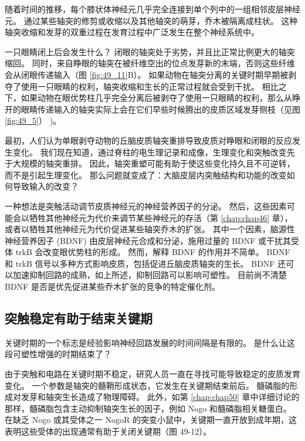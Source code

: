 随着时间的推移，每个膝状体神经元几乎完全连接到单个列中的一组相邻皮层神经元。 通过某些轴突的修剪或收缩以及其他轴突的萌芽，乔木被隔离成柱状。 这种轴突收缩和发芽的双重过程在发育过程中广泛发生在整个神经系统中。

一只眼睛闭上后会发生什么？ 闭眼的轴突处于劣势，并且比正常比例更大的轴突缩回。 同时，来自睁眼的轴突在被纤维空出的位点发芽新的末端，否则这些纤维会从闭眼传递输入（图 \ref{fig:49_11}B）。 如果动物在轴突分离的关键时期早期被剥夺了使用一只眼睛的权利，轴突收缩和生长的正常过程就会受到干扰。 相比之下，如果动物在眼优势柱几乎完全分离后被剥夺了使用一只眼睛的权利，那么从睁开的眼睛传递输入的轴突实际上会在它们早些时候腾出的皮质区域发芽侧枝（见图 \ref{fig:49_5}） )。

最初，人们认为单眼剥夺动物的丘脑皮质轴突重排导致皮质对睁眼和闭眼的反应发生变化。 我们现在知道，通过脊柱的电生理记录和成像，生理变化和突触改变先于大规模的轴突重排。 因此，轴突重塑可能有助于使这些变化持久且不可逆转，而不是引起生理变化。 那么问题就变成了：大脑皮层内突触结构和功能的改变如何导致输入的改变？

一种想法是突触活动调节皮质神经元的神经营养因子的分泌。 然后，这些因素可能会以牺牲其他神经元为代价来调节某些神经元的存活（第 \ref{chap:chap46} 章），或者以牺牲其他神经元为代价促进某些轴突乔木的扩张。 其中一个因素，脑源性神经营养因子 (BDNF) 由皮层神经元合成和分泌，施用过量的 BDNF 或干扰其受体 trkB 会改变眼优势柱的形成。 然而，解释 BDNF 的作用并不简单。 BDNF 和 trkB 信号以多种方式影响皮质，包括促进丘脑皮质轴突的生长。 BDNF 还可以加速抑制回路的成熟，如上所述，抑制回路可以影响可塑性。 目前尚不清楚 BDNF 是否是优先促进某些乔木扩张的竞争的特定催化剂。

\subsection{突触稳定有助于结束关键期}

关键时期的一个标志是经验影响神经回路发展的时间间隔是有限的。 是什么让这段可塑性增强的时期结束了？

由于突触和电路在关键时期不稳定，研究人员一直在寻找可能导致稳定的皮质发育变化。 一个参数是轴突的髓鞘形成状态，它发生在关键期结束前后。 髓磷脂的形成对发芽和轴突生长造成了物理障碍。 此外，如第 \ref{chap:chap50} 章中详细讨论的那样，髓磷脂包含主动抑制轴突生长的因子，例如 Nogo 和髓磷脂相关糖蛋白。 
在缺乏 Nogo 或其受体之一 NogoR 的突变小鼠中，关键期一直开放到成年期，这表明这些受体的出现通常有助于关闭关键期（图 49-12）。

